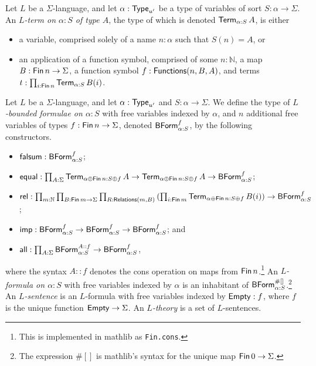 \begin{definition}
  Let \( L \) be a \( \Sigma \)-language, and let \( \alpha : \mathsf{Type}_{u'} \) be a type of variables of sort \( S : \alpha \to \Sigma \).
  An \emph{\( L \)-term on \( \alpha : S \) of type \( A \)}, the type of which is denoted \( \operatorname{\mathsf{Term}}_{\alpha:S} A \), is either
  \begin{itemize}
    \item a variable, comprised solely of a name \( n : \alpha \) such that \( S(n) = A \), or
    \item an application of a function symbol, comprised of some \( n : \mathbb N \), a map \( B : \operatorname{\mathsf{Fin}} n \to \Sigma \), a function symbol \( f : \operatorname{\mathsf{Functions}}(n, B, A) \), and terms \( t : \prod_{i : \operatorname{\mathsf{Fin}} n} \operatorname{\mathsf{Term}}_{\alpha:S} B(i) \).
  \end{itemize}
\end{definition}
\begin{definition}
  Let \( L \) be a \( \Sigma \)-language, and let \( \alpha : \mathsf{Type}_{u'} \) and \( S : \alpha \to \Sigma \).
  We define the type of \emph{\( L \)-bounded formulae on \( \alpha : S \)} with free variables indexed by \( \alpha \), and \( n \) additional free variables of types \( f : \operatorname{\mathsf{Fin}} n \to \Sigma \), denoted \( \mathsf{BForm}_{\alpha:S}^f \), by the following constructors.
  \begin{itemize}
    \item \( \operatorname{\mathsf{falsum}} : \mathsf{BForm}_{\alpha:S}^f \);
    \item \( \operatorname{\mathsf{equal}} : \prod_{A : \Sigma} \operatorname{\mathsf{Term}}_{\alpha \oplus \operatorname{\mathsf{Fin}} n : S \oplus f} A \to \operatorname{\mathsf{Term}}_{\alpha \oplus \operatorname{\mathsf{Fin}} n : S \oplus f} A \to \mathsf{BForm}_{\alpha:S}^f \);
    \item \( \operatorname{\mathsf{rel}} : \prod_{m : \mathbb N} \prod_{B : \operatorname{\mathsf{Fin}} m \to \Sigma} \prod_{R : \operatorname{\mathsf{Relations}}(m, B)} \left( \prod_{i : \operatorname{\mathsf{Fin}} m} \operatorname{\mathsf{Term}}_{\alpha \oplus \operatorname{\mathsf{Fin}} n : S \oplus f} B(i) \right) \to \mathsf{BForm}_{\alpha:S}^f \);
    \item \( \operatorname{\mathsf{imp}} : \mathsf{BForm}_{\alpha:S}^f \to \mathsf{BForm}_{\alpha:S}^f \to \mathsf{BForm}_{\alpha:S}^f \); and
    \item \( \operatorname{\mathsf{all}} : \prod_{A : \Sigma} \mathsf{BForm}_{\alpha:S}^{A :: f} \to \mathsf{BForm}_{\alpha:S}^f \),
  \end{itemize}
  where the syntax \( A :: f \) denotes the cons operation on maps from \( \operatorname{\mathsf{Fin}} n \).\footnote{This is implemented in mathlib as \texttt{Fin.cons}.}
  An \emph{\( L \)-formula on \( \alpha : S \)} with free variables indexed by \( \alpha \) is an inhabitant of \( \mathsf{BForm}_{\alpha:S}^{\#[]} \).\footnote{The expression \( \#[] \) is mathlib's syntax for the unique map \( \operatorname{\mathsf{Fin}} 0 \to \Sigma \).}
  An \emph{\( L \)-sentence} is an \( L \)-formula with free variables indexed by \( \operatorname{\mathsf{Empty}} : f \), where \( f \) is the unique function \( \operatorname{\mathsf{Empty}} \to \Sigma \).
  An \emph{\( L \)-theory} is a set of \( L \)-sentences.
\end{definition}

